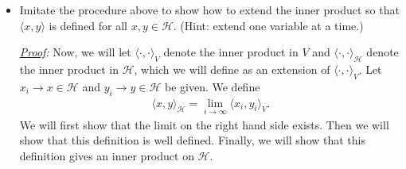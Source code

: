 \documentclass[11pt]{article}
\begin{document}
\begin{enumerate}[(a)]
\begin{itemize}
		
		
		
		
		
		
		
		
		
		
		
		
		
		
		
		\item Imitate the procedure above to show how to extend the inner product so that $\langle x,y\rangle$ is defined for all $x,y\in \mathcal{H}$. (Hint: extend one variable at a time.)
		
		
		\noindent \textit{\underline{Proof}:} Now, we will let $\langle \cdot,\cdot \rangle_V$ denote the inner product in $V$ and $\langle  \cdot, \cdot \rangle_\mathcal{H}$ denote the inner product in $\mathcal{H}$, which we will define as an extension of $\langle \cdot, \cdot \rangle_V$. Let $x_i \to x \in \mathcal{H}$ and $y_i \to y \in \mathcal{H}$ be given. We define 
		\begin{align*}
		\langle x,y\rangle_\mathcal{H} = \lim_{i\to \infty}\langle x_i, y_i\rangle_V.
		\end{align*}
		We will first show that the limit on the right hand side exists. Then we will show that this definition is well defined. Finally, we will show that this definition gives an inner product on $\mathcal{H}$. 
		

\end{itemize}
\end{enumerate}
\end{document}
